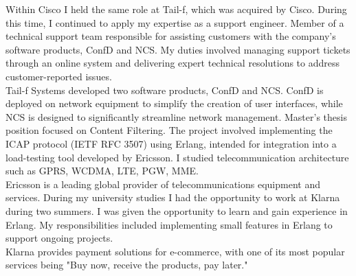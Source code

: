 \documentclass[purpleprocv]{procv}
\begin{document}
\begin{procv-twocolumns}
{          
          {Within Cisco I held the same role at Tail-f, which was acquired by Cisco. During this time, 
          I continued to apply my expertise as a support engineer.}
          {Member of a technical support team responsible for assisting customers with the company’s software 
          products, ConfD and NCS. My duties involved managing support tickets through an online system and delivering expert 
          technical resolutions to address customer-reported issues.
          \\[3pt]
          Tail-f Systems developed two software products, ConfD and NCS. ConfD is deployed on network equipment to simplify 
          the creation of user interfaces, while NCS is designed to significantly streamline network management.}
          {Master’s thesis position focused on Content Filtering. The project involved implementing the ICAP 
          protocol (IETF RFC 3507) using Erlang, intended for integration into a load-testing tool developed by Ericsson.
          I studied telecommunication architecture such as GPRS, WCDMA, LTE, PGW, MME.
          \\[3pt]
          Ericsson is a leading global provider of telecommunications equipment and services.}
          {During my university studies I had the opportunity to work at Klarna during two summers. I was given the opportunity to learn and 
          gain experience in Erlang. My responsibilities included implementing small features in Erlang to support ongoing projects.
          \\[3pt]
          Klarna provides payment solutions for e-commerce, with one of its most popular services being 
          "Buy now, receive the products, pay later."}
        }
\end{procv-twocolumns}
\end{document}
